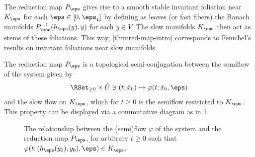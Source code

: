 \documentclass[a4paper]{siamart190516}
\begin{document}
The reduction map $P_{\eps}$ gives rise to a smooth stable invariant foliation near $K_{\eps}$ for each 
$\eps \in[0,\eps_1]$ by defining as leaves (or fast fibers) the Banach manifolds
$P_{\eps}^{-1}(h_{\eps}(y),y)$ for each $y \in \overline{V}$. The slow manifolds $K_{\eps}$
then act as stems of these foliations. This way, \cref{thm:red-map-intro}
corresponds to Fenichel's results on invariant foliations near slow manifolds.  

The reduction map $P_{\eps}$ is a topological semi-conjugation between the semiflow of the system given by
\[
\RSet_{\geq 0} \times \hat{U} \ni (t; \hat{x}_0) \mapsto \varphi(t; \hat{x}_0, \eps)
\]
 and the slow flow on $K_{\eps}$, which for $t \geq 0$ is the semiflow restricted to
 $K_{\eps}$. This property can be displayed via a commutative diagram as in
 \cref{fig:com-dia-red-map-intro}.

 \begin{figure}\label{fig:com-dia-red-map-intro}\centering
{}
\caption{The relationship between the (semi)flow $\varphi$ of the system and the reduction map $P_{\eps}$, for arbitrary $t \geq 0$ such
			that $\varphi(t; (h_{\eps}(y_0),y_0),\eps) \in K_{\eps}$.}
\end{figure}
\end{document}

